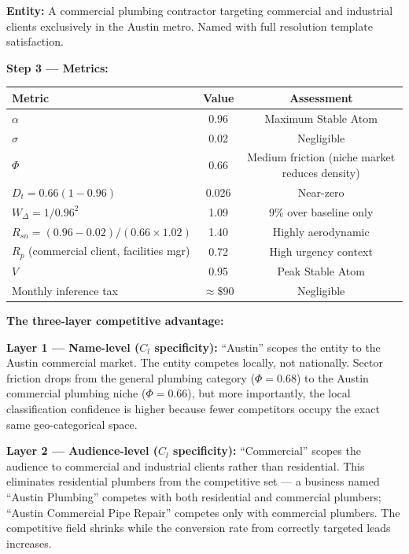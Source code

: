 \documentclass[12pt, openany]{book}
\theoremstyle{thmstyle}
\theoremstyle{defstyle}
\begin{document}
\begin{casebox}
\textbf{Entity:} A commercial plumbing contractor targeting commercial and industrial clients exclusively in the Austin metro. Named with full resolution template satisfaction.

\textbf{Step 3 --- Metrics:}
\begin{center}
\begin{tabular}{lcc}
\toprule
Metric & Value & Assessment \\
\midrule
$\alpha$ & 0.96 & Maximum Stable Atom \\
$\sigma$ & 0.02 & Negligible \\
$\Phi$ & 0.66 & Medium friction (niche market reduces density) \\
$D_t = 0.66(1-0.96)$ & 0.026 & Near-zero \\
$W_\Delta = 1/0.96^2$ & 1.09 & 9\% over baseline only \\
$R_{sn} = (0.96-0.02)/(0.66 \times 1.02)$ & 1.40 & Highly aerodynamic \\
$R_p$ (commercial client, facilities mgr) & 0.72 & High urgency context \\
$V$ & 0.95 & Peak Stable Atom \\
Monthly inference tax & $\approx \$90$ & Negligible \\
\bottomrule
\end{tabular}
\end{center}

\textbf{The three-layer competitive advantage:}

\textbf{Layer 1 --- Name-level ($C_l$ specificity):} ``Austin'' scopes the entity to the Austin commercial market. The entity competes locally, not nationally. Sector friction drops from the general plumbing category ($\Phi = 0.68$) to the Austin commercial plumbing niche ($\Phi = 0.66$), but more importantly, the local classification confidence is higher because fewer competitors occupy the exact same geo-categorical space.

\textbf{Layer 2 --- Audience-level ($C_l$ specificity):} ``Commercial'' scopes the audience to commercial and industrial clients rather than residential. This eliminates residential plumbers from the competitive set --- a business named ``Austin Plumbing'' competes with both residential and commercial plumbers; ``Austin Commercial Pipe Repair'' competes only with commercial plumbers. The competitive field shrinks while the conversion rate from correctly targeted leads increases.


\end{casebox}
\end{document}
